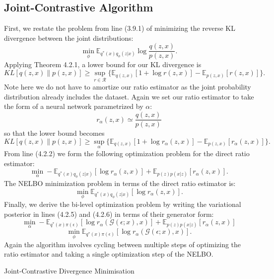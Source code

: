 \documentclass[honours,12pt]{unswthesis}
\newcommand{\E}{\mathbb{E}}
\numberwithin{equation}{section}
\theoremstyle{definition}
\begin{document}
\subsection{Joint-Contrastive Algorithm}
First, we restate the problem from line (3.9.1) of minimizing the reverse KL divergence between the joint distributions:
\[\min_\phi \mathbb{E}_{q^*(x)q_\phi(z|x)}\log \frac{q(z,x)}{p(z,x)}.\]
Applying Theorem 4.2.1, a lower bound for our KL divergence is
\[KL[q(z,x)\|p(z,x)]\geq \sup_{r\in \mathcal{R}}\{\mathbb{E}_{q(z,x)}[1+\log r(z,x)]-\mathbb{E}_{p(z,x)}[r(z,x)]\}.\]
Note here we do not have to amortize our ratio estimator as the joint probability distribution already includes the dataset. Again we set our ratio estimator to take the form of a neural network parametrized by $\alpha$:
\[r_\alpha(z,x)\simeq \frac{q(z,x)}{p(z,x)}\]
so that the lower bound becomes
\[KL[q(z,x)\|p(z,x)]\geq \sup_{\alpha}\{\mathbb{E}_{q(z,x)}[1+\log r_\alpha(z,x)]-\mathbb{E}_{p(z,x)}[r_\alpha(z,x)]\}.\]
From line (4.2.2) we form the following optimization problem for the direct ratio estimator:
\begin{equation}
\min_\alpha-\E_{q^*(x)q_\phi(z|x)}[\log r_\alpha(z,x)]+\E_{p(z)p(x|z)}[r_\alpha(z,x)].
\end{equation}
The NELBO minimization problem in terms of the direct ratio estimator is:
\begin{equation}
\min_\phi \mathbb{E}_{q^*(x)q_\phi(z|x)}[\log r_\alpha(z,x)].
\end{equation}
Finally, we derive the bi-level optimization problem by writing the variational posterior in lines (4.2.5) and (4.2.6) in terms of their generator form:
\[\min_\alpha -\mathbb{E}_{q^*(x)\pi(\epsilon)}[\log r_\alpha(\mathcal{G}(\epsilon;x),x)]+\mathbb{E}_{p(z)p(x|z)}[r_\alpha(z,x)]\]
\[\min_\phi \mathbb{E}_{q^*(x)\pi(\epsilon)}[\log r_\alpha(\mathcal{G}(\epsilon;x),x)].\]
Again the algorithm involves cycling between multiple steps of optimizing the ratio estimator and taking a single optimization step of the NELBO.
\newpage
\begin{algorithm}
\caption{Joint-Contrastive Divergence Minimisation}
\BlankLine
{}
\end{algorithm}
\newpage
\end{document}
